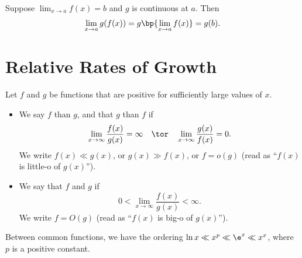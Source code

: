 \begin{proposition}
    Suppose $\lim_{x \to a} f(x) = b$ and $g$ is continuous at $a$. Then \[\lim_{x \to a} g(f(x)) = g\bp{\lim_{x \to a} f(x)} = g(b).\]
\end{proposition}

\section{Relative Rates of Growth}

\begin{definition}
    Let $f$ and $g$ be functions that are positive for sufficiently large values of $x$. 
    \begin{itemize}
        \item We say $f$  than $g$, and that $g$  than $f$ if \[\lim_{x \to \infty} \frac{f(x)}{g(x)} = \infty \quad \tor \quad \lim_{x \to \infty} \frac{g(x)}{f(x)} = 0.\] We write $f(x) \ll g(x)$, or $g(x) \gg f(x)$, or $f = o(g)$ (read as ``$f(x)$ is little-o of $g(x)$'').
        \item We say that $f$ and $g$  if \[0 < \lim_{x \to \infty} \frac{f(x)}{g(x)} < \infty.\] We write $f = O(g)$ (read as ``$f(x)$ is big-o of $g(x)$'').
    \end{itemize}
\end{definition}

Between common functions, we have the ordering $\ln x \ll x^p \ll \e^x \ll x^x$, where $p$ is a positive constant.